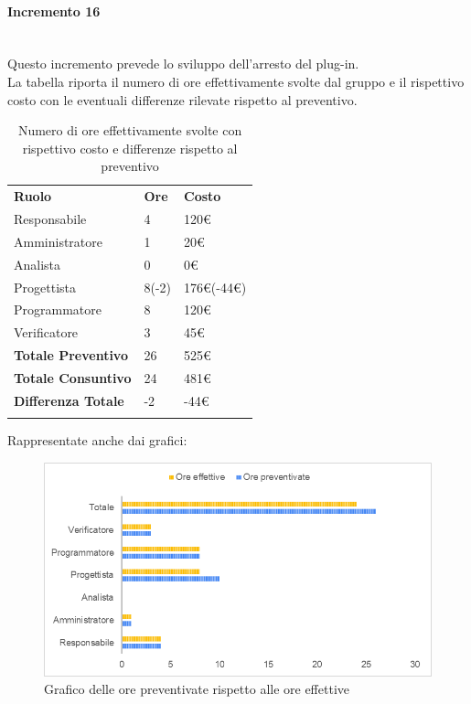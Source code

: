 \paragraph{Incremento 16} \mbox{} \\
Questo incremento prevede lo sviluppo dell'arresto del plug-in. \\
La tabella riporta il numero di ore effettivamente svolte dal gruppo e il rispettivo costo con le eventuali differenze rilevate rispetto al preventivo.
\begin{longtable} {							
		>{}p{40mm}  
		>{}p{20mm}	
		>{}p{28mm}			
	}			
	\rowcolor{gray!50}
	
	\textbf{Ruolo}            & \textbf{Ore} & \textbf{Costo}       \TBstrut \\
	Responsabile              & 4            & 120\euro             \TBstrut \\
	Amministratore            & 1            & 20\euro              \TBstrut \\
	Analista                  & 0            & 0\euro               \TBstrut \\
	Progettista               & 8(-2)        & 176\euro(-44\euro)   \TBstrut \\
	Programmatore             & 8            & 120\euro             \TBstrut \\
	Verificatore              & 3            & 45\euro              \TBstrut \\
	\textbf{Totale Preventivo}& 26           & 525\euro             \TBstrut \\	
	\textbf{Totale Consuntivo}& 24           & 481\euro             \TBstrut \\	
	\textbf{Differenza Totale}& -2           & -44\euro             \TBstrut \\
	\rowcolor{white}
	\caption{Numero di ore effettivamente svolte con rispettivo costo e differenze rispetto al preventivo}	
\end{longtable}

Rappresentate anche dai grafici:
\begin{figure} [H]
	\includegraphics[width=\linewidth]{./img/Grafici/41.png}
	\caption{Grafico delle ore preventivate rispetto alle ore effettive}
\end{figure}

